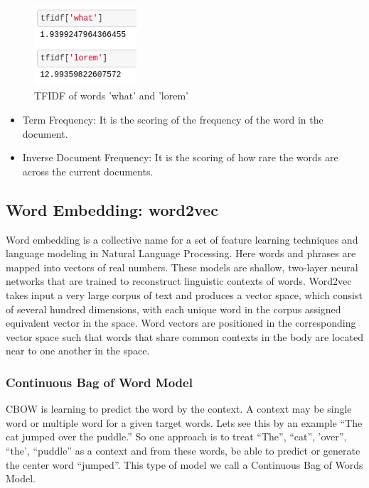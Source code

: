 \begin{figure}[tbh]
\begin{center}
	\includegraphics[width = 1.5in]{images/some_tfidf.png}
	\caption{\ac{TFIDF} of words 'what' and 'lorem'}
	\label{some_tfidf}
\end{center}
\end{figure}

\begin{itemize}
\item Term Frequency: It is the scoring of the frequency of the word in the document.
\item Inverse Document Frequency: It is the scoring of how rare the words are across the current documents.
\end{itemize} 

\subsection{Word Embedding: word2vec}
Word embedding is a collective name for a set of feature learning techniques and language modeling in Natural Language Processing. Here words and phrases are mapped into vectors of real numbers. These models are shallow, two-layer neural networks that are trained to reconstruct linguistic contexts of words. Word2vec \cite{DBLPRong14} takes input a very large corpus of text and produces a vector space, which consist of several hundred dimensions, with each unique word in the corpus assigned equivalent vector in the space. Word vectors are positioned in the corresponding vector space such that words that share common contexts in the body are located near to one another in the space. 

\subsubsection{Continuous Bag of Word Model}
\ac{CBOW} is learning to predict the word by the context. A context may be single word or multiple word for a given target words. Lets see this by an example “The cat jumped over the puddle.” So one approach is to treat {“The”, “cat”, ’over”, “the’, “puddle”} as a context and from these words, be able to predict or generate the center word “jumped”. This type of model we call a Continuous Bag of Words  Model.

